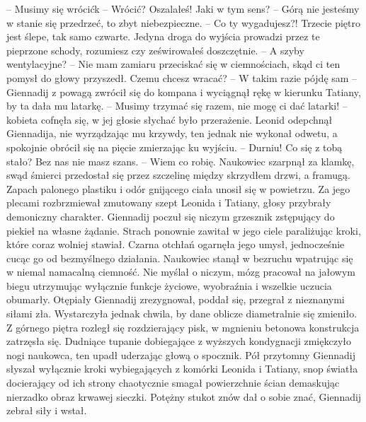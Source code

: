 \documentclass[../MAIN.tex]{subfiles}
\begin{document}
-- Musimy się wrócić\3k 
-- Wrócić? Oszalałeś! Jaki w tym sens? 
-- Górą nie jesteśmy w stanie się przedrzeć, to zbyt niebezpieczne. 
-- Co ty wygadujesz?! Trzecie piętro jest ślepe, tak samo czwarte. Jedyna droga do wyjścia prowadzi przez te pieprzone schody, rozumiesz czy ześwirowałeś doszczętnie. 
-- A szyby wentylacyjne? 
-- Nie mam zamiaru przeciskać się w ciemnościach, skąd ci ten pomysł do głowy przyszedł. Czemu chcesz wracać? 
-- W takim razie pójdę sam -- Giennadij z powagą zwrócił się do kompana i wyciągnął rękę w kierunku Tatiany, by ta dała mu latarkę. 
-- Musimy trzymać się razem, nie mogę ci dać latarki! -- kobieta cofnęła się, w jej głosie słychać było przerażenie. 
Leonid odepchnął Giennadija, nie wyrządzając mu krzywdy, ten jednak nie wykonał odwetu, a spokojnie obrócił się na pięcie zmierzając ku wyjściu. 
-- Durniu! Co się z tobą stało? Bez nas nie masz szans. 
-- Wiem co robię. 
Naukowiec szarpnął za klamkę, swąd śmierci przedostał się przez szczelinę między skrzydłem drzwi, a framugą. Zapach palonego plastiku i odór gnijącego ciała unosił się w powietrzu. Za jego plecami rozbrzmiewał zmutowany szept Leonida i Tatiany, głosy przybrały demoniczny charakter. Giennadij poczuł się niczym grzesznik zstępujący do piekieł na własne żądanie. Strach ponownie zawitał w jego ciele paraliżując kroki, które coraz wolniej stawiał. Czarna otchłań ogarnęła jego umysł, jednocześnie cucąc go od bezmyślnego działania. Naukowiec stanął w bezruchu wpatrując się w niemal namacalną ciemność. Nie myślał o niczym, mózg pracował na jałowym biegu utrzymując wyłącznie funkcje życiowe, wyobraźnia i wszelkie uczucia obumarły. Otępiały Giennadij zrezygnował, poddał się, przegrał z nieznanymi siłami zła. Wystarczyła jednak chwila, by dane oblicze diametralnie się zmieniło. Z górnego piętra rozległ się rozdzierający pisk, w mgnieniu betonowa konstrukcja zatrzęsła się. Dudniące tupanie dobiegające z wyższych kondygnacji zmiękczyło nogi naukowca, ten upadł uderzając głową o spocznik. Pół przytomny Giennadij słyszał wyłącznie kroki wybiegających z komórki Leonida i Tatiany, snop światła docierający od ich strony chaotycznie smagał powierzchnie ścian demaskując nierzadko obraz krwawej sieczki. Potężny stukot znów dał o sobie znać, Giennadij zebrał siły i wstał. 
\end{document}
